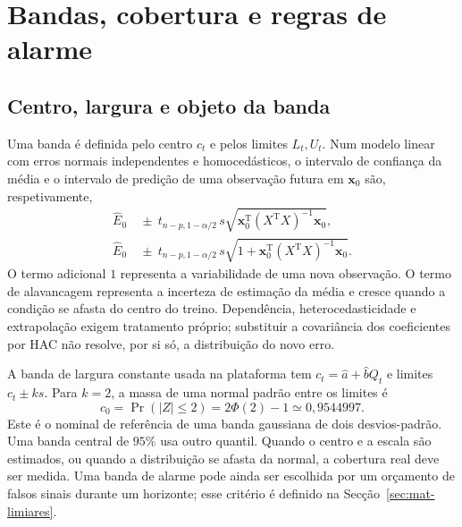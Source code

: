 \section{Bandas, cobertura e regras de alarme}
\label{sec:mat-bandas}

\subsection{Centro, largura e objeto da banda}
\label{sec:mat-tipos-banda}
Uma banda é definida pelo centro $c_t$ e pelos limites $L_t,U_t$. Num modelo linear com erros normais independentes e homocedásticos, o intervalo de confiança da média e o intervalo de predição de uma observação futura em $\boldsymbol x_0$ são, respetivamente,
\begin{align}
\widehat E_0&\ \pm\ t_{n-p,1-\alpha/2}\,s
\sqrt{\boldsymbol x_0^{\mathrm T}(X^{\mathrm T}X)^{-1}\boldsymbol x_0},
\label{eq:mat-ic-media}\\
\widehat E_0&\ \pm\ t_{n-p,1-\alpha/2}\,s
\sqrt{1+\boldsymbol x_0^{\mathrm T}(X^{\mathrm T}X)^{-1}\boldsymbol x_0}.
\label{eq:mat-ip-observacao}
\end{align}
O termo adicional $1$ representa a variabilidade de uma nova observação. O termo de alavancagem representa a incerteza de estimação da média e cresce quando a condição se afasta do centro do treino. Dependência, heterocedasticidade e extrapolação exigem tratamento próprio; substituir a covariância dos coeficientes por HAC não resolve, por si só, a distribuição do novo erro.

A banda de largura constante usada na plataforma tem $c_t=\widehat a+\widehat bQ_t$ e limites $c_t\pm ks$. Para $k=2$, a massa de uma normal padrão entre os limites é
\begin{equation}
c_0=\Pr(|Z|\leq2)=2\Phi(2)-1\simeq0{,}9544997.
\label{eq:mat-dois-sigma}
\end{equation}
Este é o nominal de referência de uma banda gaussiana de dois desvios-padrão. Uma banda central de $95\%$ usa outro quantil. Quando o centro e a escala são estimados, ou quando a distribuição se afasta da normal, a cobertura real deve ser medida. Uma banda de alarme pode ainda ser escolhida por um orçamento de falsos sinais durante um horizonte; esse critério é definido na Secção~\ref{sec:mat-limiares}.


